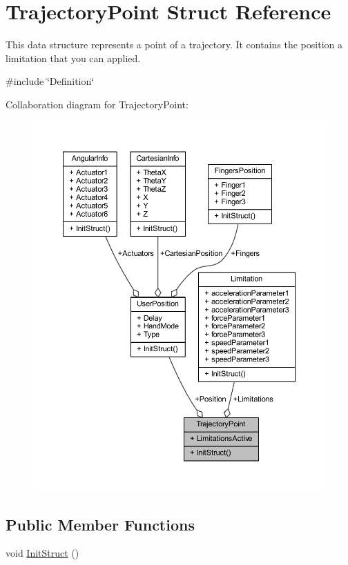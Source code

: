 \hypertarget{structTrajectoryPoint}{}\section{Trajectory\+Point Struct Reference}
\label{structTrajectoryPoint}


This data structure represents a point of a trajectory. It contains the position a limitation that you can applied.  




{\ttfamily \#include \char`\"{}Definition\char`\"{}}



Collaboration diagram for Trajectory\+Point\+:
\nopagebreak
\begin{figure}[H]
\begin{center}
\leavevmode
\includegraphics[width=350pt]{de/dc4/structTrajectoryPoint__coll__graph}
\end{center}
\end{figure}
\subsection*{Public Member Functions}
\begin{DoxyCompactItemize}
\item 
void \hyperlink{structTrajectoryPoint_a1a9f12ad88f5011c6a4644792fa67f99}{Init\+Struct} ()
\end{DoxyCompactItemize}
